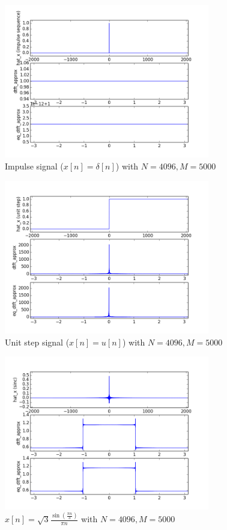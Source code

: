 \begin{figure}[htbp]
	\centering
	\includegraphics[width=0.8\textwidth]{images/p6-3-5000}
	\caption{Impulse signal ($x[n] = \delta[n]$) with $N=4096, M=5000$}
	\label{fig:p6-3-5000}
\end{figure}

\begin{figure}[htbp]
	\centering
	\includegraphics[width=0.8\textwidth]{images/p6-4-5000}
	\caption{Unit step signal ($x[n]=u[n]$) with $N=4096, M=5000$}
	\label{fig:p6-4-5000}
\end{figure}

\begin{figure}[htbp]
	\centering
	\includegraphics[width=0.8\textwidth]{images/p6-5-5000}
	\caption{$x[n] = \sqrt{3}\frac{\sin(\frac{\pi n}{3})}{\pi n}$ with $N=4096, M=5000$}
	\label{fig:p6-5-5000}
\end{figure}


